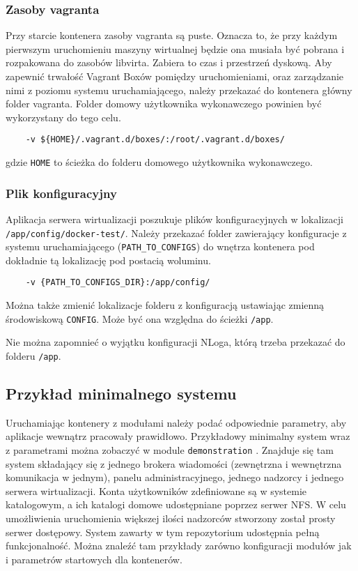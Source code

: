 \documentclass[../opis-rozwiazania.tex]{subfiles}
\begin{document}
\subsubsection{Zasoby vagranta}
Przy starcie kontenera zasoby vagranta są puste.
Oznacza to, że przy każdym pierwszym uruchomieniu maszyny wirtualnej będzie ona musiała być pobrana i rozpakowana do zasobów libvirta.
Zabiera to czas i przestrzeń dyskową.
Aby zapewnić trwałość Vagrant Boxów pomiędzy uruchomieniami, oraz zarządzanie nimi z poziomu systemu uruchamiającego, należy przekazać do kontenera główny folder vagranta.
Folder domowy użytkownika wykonawczego powinien być wykorzystany do tego celu.

\begin{verbatim}
	-v ${HOME}/.vagrant.d/boxes/:/root/.vagrant.d/boxes/
\end{verbatim}
gdzie \texttt{HOME} to ścieżka do folderu domowego użytkownika wykonawczego.

\subsubsection{Plik konfiguracyjny}
Aplikacja serwera wirtualizacji poszukuje plików konfiguracyjnych w lokalizacji \texttt{/app/config/docker-test/}.
Należy przekazać folder zawierający konfiguracje z systemu uruchamiającego (\texttt{PATH\_TO\_CONFIGS}) do wnętrza kontenera pod dokładnie tą lokalizację pod postacią woluminu.
\begin{verbatim}
	-v {PATH_TO_CONFIGS_DIR}:/app/config/
\end{verbatim}

Można także zmienić lokalizacje folderu z konfiguracją ustawiając zmienną środowiskową \texttt{CONFIG}.
Może być ona względna do ścieżki \texttt{/app}.

Nie można zapomnieć o wyjątku konfiguracji NLoga, którą trzeba przekazać do folderu \texttt{/app}.

\subsection{Przykład minimalnego systemu}
Uruchamiając kontenery z modułami należy podać odpowiednie parametry, aby aplikacje wewnątrz pracowały prawidłowo.
Przykładowy minimalny system wraz z parametrami można zobaczyć w module \texttt{demonstration} \parencite{ocd-demo}.
Znajduje się tam system składający się z jednego brokera wiadomości (zewnętrzna i wewnętrzna komunikacja w jednym), panelu administracyjnego, jednego nadzorcy i jednego serwera wirtualizacji. Konta użytkowników zdefiniowane są w systemie katalogowym, a ich katalogi domowe udostępniane poprzez serwer NFS. W celu umożliwienia uruchomienia większej ilości nadzorców stworzony został prosty serwer dostępowy.
System zawarty w tym repozytorium udostępnia pełną funkcjonalność.
Można znaleźć tam przykłady zarówno konfiguracji modułów jak i parametrów startowych dla kontenerów.
\end{document}

